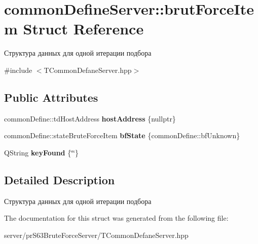 \hypertarget{structcommon_define_server_1_1brut_force_item}{}\section{common\+Define\+Server\+:\+:brut\+Force\+Item Struct Reference}
\label{structcommon_define_server_1_1brut_force_item}


Структура данных для одной итерации подбора  




{\ttfamily \#include $<$T\+Common\+Defane\+Server.\+hpp$>$}

\subsection*{Public Attributes}
\begin{DoxyCompactItemize}
\item 
\mbox{\label{structcommon_define_server_1_1brut_force_item_ad70aa81f18f694d11fe3856872d05034}} 
common\+Define\+::td\+Host\+Address {\bfseries host\+Address} \{nullptr\}
\item 
\mbox{\label{structcommon_define_server_1_1brut_force_item_a0ffc732b5007fdb161cf65d8cc447b38}} 
common\+Define\+::state\+Brute\+Force\+Item {\bfseries bf\+State} \{common\+Define\+::bf\+Unknown\}
\item 
\mbox{\label{structcommon_define_server_1_1brut_force_item_ae138531520786044e0629924bc49d06b}} 
Q\+String {\bfseries key\+Found} \{\char`\"{}\char`\"{}\}
\end{DoxyCompactItemize}


\subsection{Detailed Description}
Структура данных для одной итерации подбора 

The documentation for this struct was generated from the following file\+:\begin{DoxyCompactItemize}
\item 
server/pr\+S63\+Brute\+Force\+Server/T\+Common\+Defane\+Server.\+hpp\end{DoxyCompactItemize}
